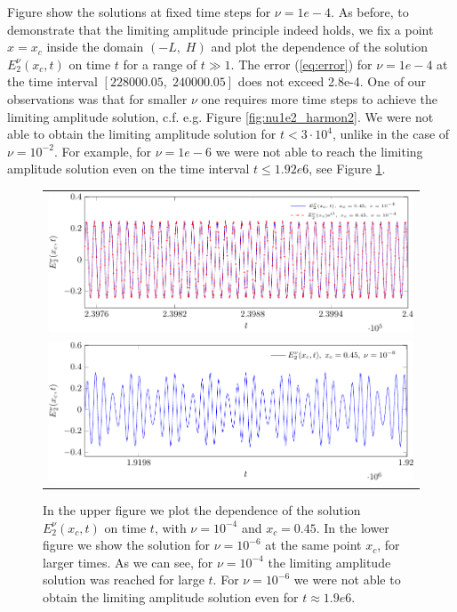 \documentclass[a4paper,10pt]{article}
\begin{document}
Figure show the solutions at fixed time steps for $\nu=1e-4$. As before, 
to demonstrate that the limiting amplitude principle indeed holds, we fix a point $x=x_c$ 
inside the domain $(-L,\; H)$ and plot 
the dependence of the solution $E_{2}^{\nu}(x_c,t)$ on time $t$ for a range of $t\gg 1$. 
The error (\ref{eq:error}) for $\nu=1e-4$ at the time interval $[228000.05,\; 240000.05]$ does not exceed 2.8e-4. 
One of our observations was that for smaller $\nu$ one requires more time steps to achieve the limiting amplitude solution, 
c.f. e.g. Figure \ref{fig:nu1e2_harmon2}. 
We were not able to obtain the limiting amplitude solution for $t<3\cdot 10^{4}$, unlike in the case of $\nu=10^{-2}$. 
For example, for $\nu=1e-6$ we were not able to reach the limiting amplitude solution even on the time interval $t\leq 1.92e6$, 
see Figure \ref{fig:nu1e4_harmon}. 
\begin{figure}
\begin{tabular}{c}
 \includegraphics[width=\textwidth]{figure_nu1e4-crop.pdf}\\
 \includegraphics[width=\textwidth]{figure_nu1e6-crop.pdf}\\
\end{tabular}
\caption{In the upper figure we plot the dependence of the solution $E_{2}^{\nu}(x_c,t)$ on time $t$, with $\nu=10^{-4}$ and $x_c=0.45$. 
In the lower figure we show the solution for $\nu=10^{-6}$ at the same point $x_c$, for larger times. As we can see, for 
$\nu=10^{-4}$ the limiting amplitude solution was reached for large $t$. For $\nu=10^{-6}$ we were not able 
to obtain the limiting amplitude solution even for $t\approx 1.9e6$. }
  \label{fig:nu1e4_harmon}
\end{figure}
\end{document}
